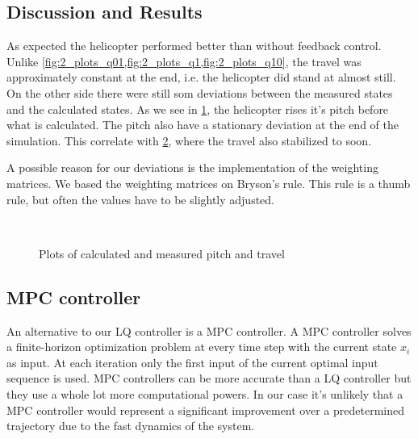 \subsection{Discussion and Results}

As expected the helicopter performed better than without feedback control. Unlike \cref{fig:2_plots_q01,fig:2_plots_q1,fig:2_plots_q10}, the travel was approximately constant at the end, i.e. the helicopter did stand at almost still. On the other side there were still som deviations between the measured states and the calculated states. As we see in \cref{fig:3_pitch}, the helicopter rises it's pitch before what is calculated. The pitch also have a stationary deviation at the end of the simulation. This correlate with \cref{fig:3_travel}, where the travel also stabilized to soon.

A possible reason for our deviations is the implementation of the weighting matrices. We based the weighting matrices on Bryson's rule. This rule is a thumb rule, but often the values have to be slightly adjusted.

\begin{figure}[h]
    \begin{subfigure}[t]{0.5\textwidth}
        \centering
        
        \label{fig:3_pitch}
    \end{subfigure}%
    ~
     \begin{subfigure}[t]{0.5\textwidth}
        \centering
        
        \label{fig:3_travel}
    \end{subfigure}
    \caption{Plots of calculated and measured pitch and travel}\label{fig:3_plots}
\end{figure}


\subsection{MPC controller}

An alternative to our LQ controller is a MPC controller. A MPC controller solves a finite-horizon optimization problem at every time step with the current state $x_i$ as input. At each iteration only the first input of the current optimal input sequence is used. MPC controllers can be more accurate than a LQ controller but they use a whole lot more computational powers. In our case it's unlikely that a MPC controller would represent a significant improvement over a predetermined trajectory due to the fast dynamics of the system.
